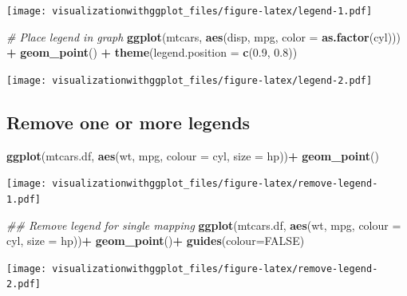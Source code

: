 \documentclass[]{krantz}
\makeatletter
\newenvironment{Shaded}{\begin{snugshade}}{\end{snugshade}}
\newcommand{\CommentTok}[1]{\textcolor[rgb]{0.56,0.35,0.01}{\textit{#1}}}
\newcommand{\DataTypeTok}[1]{\textcolor[rgb]{0.13,0.29,0.53}{#1}}
\newcommand{\FloatTok}[1]{\textcolor[rgb]{0.00,0.00,0.81}{#1}}
\newcommand{\KeywordTok}[1]{\textcolor[rgb]{0.13,0.29,0.53}{\textbf{#1}}}
\newcommand{\NormalTok}[1]{#1}
\newcommand{\OperatorTok}[1]{\textcolor[rgb]{0.81,0.36,0.00}{\textbf{#1}}}
\newcommand{\OtherTok}[1]{\textcolor[rgb]{0.56,0.35,0.01}{#1}}
\newcommand{\StringTok}[1]{\textcolor[rgb]{0.31,0.60,0.02}{#1}}
\newenvironment{kframe}{%
\medskip{}
\setlength{\fboxsep}{.8em}
 \def\at@end@of@kframe{}%
 \ifinner\ifhmode%
  \def\at@end@of@kframe{\end{minipage}}%
  \begin{minipage}{\columnwidth}%
 \fi\fi%
 \def\FrameCommand##1{\hskip\@totalleftmargin \hskip-\fboxsep
 \colorbox{shadecolor}{##1}\hskip-\fboxsep
     \hskip-\linewidth \hskip-\@totalleftmargin \hskip\columnwidth}%
 \MakeFramed {\advance\hsize-\width
   \@totalleftmargin\z@ \linewidth\hsize
   \@setminipage}}%
 {\par\unskip\endMakeFramed%
 \at@end@of@kframe}
\renewenvironment{Shaded}{\begin{kframe}}{\end{kframe}}
\makeatother
\begin{document}
\texttt{[image: visualizationwithggplot\_files/figure-latex/legend-1.pdf]}

\begin{Shaded}
\begin{Highlighting}[]
\CommentTok{# Place legend in graph}
\KeywordTok{ggplot}\NormalTok{(mtcars, }\KeywordTok{aes}\NormalTok{(disp,  mpg, }\DataTypeTok{color =} \KeywordTok{as.factor}\NormalTok{(cyl))) }\OperatorTok{+}\StringTok{ }\KeywordTok{geom_point}\NormalTok{() }\OperatorTok{+}
\StringTok{  }\KeywordTok{theme}\NormalTok{(}\DataTypeTok{legend.position =} \KeywordTok{c}\NormalTok{(}\FloatTok{0.9}\NormalTok{, }\FloatTok{0.8}\NormalTok{))}
\end{Highlighting}
\end{Shaded}

\texttt{[image: visualizationwithggplot\_files/figure-latex/legend-2.pdf]}

\hypertarget{remove-one-or-more-legends}{%
\subsection{Remove one or more legends}\label{remove-one-or-more-legends}}

\begin{Shaded}
\begin{Highlighting}[]
\KeywordTok{ggplot}\NormalTok{(mtcars.df, }\KeywordTok{aes}\NormalTok{(wt, mpg, }\DataTypeTok{colour =}\NormalTok{ cyl, }\DataTypeTok{size =}\NormalTok{ hp))}\OperatorTok{+}
\StringTok{  }\KeywordTok{geom_point}\NormalTok{()}
\end{Highlighting}
\end{Shaded}

\texttt{[image: visualizationwithggplot\_files/figure-latex/remove-legend-1.pdf]}

\begin{Shaded}
\begin{Highlighting}[]
\CommentTok{## Remove legend for single mapping}
\KeywordTok{ggplot}\NormalTok{(mtcars.df, }\KeywordTok{aes}\NormalTok{(wt, mpg, }\DataTypeTok{colour =}\NormalTok{ cyl, }\DataTypeTok{size =}\NormalTok{ hp))}\OperatorTok{+}
\StringTok{  }\KeywordTok{geom_point}\NormalTok{()}\OperatorTok{+}
\StringTok{  }\KeywordTok{guides}\NormalTok{(}\DataTypeTok{colour=}\OtherTok{FALSE}\NormalTok{)}
\end{Highlighting}
\end{Shaded}

\texttt{[image: visualizationwithggplot\_files/figure-latex/remove-legend-2.pdf]}
\end{document}
